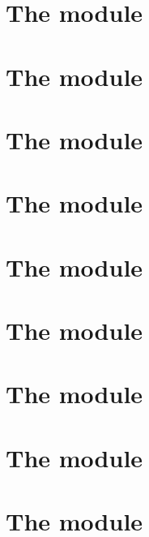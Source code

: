 \documentclass[fleqn]{report}
\newcounter{alu_ext_counter}
\begin{document}
\chapter{The \expMod{} module}                       \label{chap: exp}             \minitoc    
\chapter{The \gasMod{} module}                       \label{chap: gas}             \minitoc    
\chapter{The \trmMod{} module}                       \label{chap: trm}             \minitoc    
\iffalse                                                                                \fi    
\chapter{The \eucMod{} module}                       \label{chap: euc}             \minitoc    
\chapter{The \binMod{} module}                       \label{chap: bin}             \minitoc    
\chapter{The \shfMod{} module}                       \label{chap: shf}             \minitoc    
\chapter{The \wcpMod{} module}                       \label{chap: wcp}             \minitoc    
\chapter{The \btcMod{} module}                       \label{chap: block data}      \minitoc    
\chapter{The \blockHashMod{} module}                 \label{chap: block hash}      \minitoc    
\end{document}
